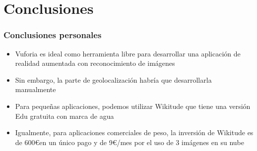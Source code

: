 \section{Conclusiones}
\frame
{
\frametitle{Conclusiones personales}
\begin{itemize}
 \item Vuforia es ideal como herramienta libre para desarrollar una aplicación de realidad aumentada con reconocimiento de imágenes
 \item Sin embargo, la parte de geolocalización habría que desarrollarla manualmente
 \item Para pequeñas aplicaciones, podemos utilizar Wikitude que tiene una versión Edu gratuita con marca de agua
 \item Igualmente, para aplicaciones comerciales de peso, la inversión de Wikitude es de 600\euro \hspace{0.15cm}en un único pago y de 9\euro/mes por el uso de 3 imágenes en su nube
\end{itemize}
}
